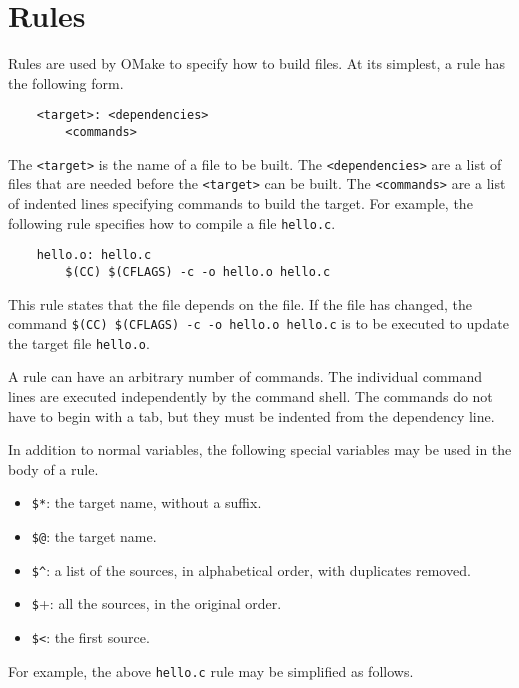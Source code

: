 %
%
%
\chapter{Rules}
\label{chapter:rules}

Rules are used by OMake to specify how to build files.  At its simplest, a rule has the following
form.

\begin{verbatim}
    <target>: <dependencies>
        <commands>
\end{verbatim}

The \verb+<target>+ is the name of a file to be built.  The \verb+<dependencies>+ are a list of
files that are needed before the \verb+<target>+ can be built.  The \verb+<commands>+ are a list of
indented lines specifying commands to build the target.  For example, the following rule specifies
how to compile a file \verb+hello.c+.

\begin{verbatim}
    hello.o: hello.c
        $(CC) $(CFLAGS) -c -o hello.o hello.c
\end{verbatim}

This rule states that the  file depends on the  file.  If the
 file has changed, the command \verb+$(CC) $(CFLAGS) -c -o hello.o hello.c+ is to
be executed to update the target file \verb+hello.o+.

A rule can have an arbitrary number of commands.  The individual command lines are executed
independently by the command shell.  The commands do not have to begin with a tab, but they must be
indented from the dependency line.

In addition to normal variables, the following special variables may be used in the body of a rule.

\begin{itemize}
\item \verb+$*+: the target name, without a suffix.
\item \verb+$@+: the target name.
\item \verb+$^+: a list of the sources, in alphabetical order, with
duplicates removed.
\item \verb+$++: all the sources, in the original order.
\item \verb+$<+: the first source.
\end{itemize}

For example, the above \verb+hello.c+ rule may be simplified as follows.

